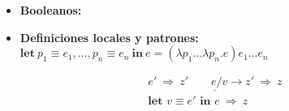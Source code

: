 \begin{itemize}
\begin{itemize}
\begin{multicols}{3}
              \[i'\neq 0\]
            \end{multicols}
          \end{itemize}
        \item \textbf{Booleanos:}
          \begin{itemize}
          \end{itemize}
        \item \textbf{Definiciones locales y patrones:} $\textbf{let}\ p_1 \equiv e_1, \ldots, p_n \equiv e_n\ \textbf{in}\ e = (\lambda p_1\ldots\lambda p_n.e) e_1 \ldots e_n$
          
          \[\begin{array}{c}
            \underline{e'\ \Rightarrow\  z' \qquad e/v \to z'\ \Rightarrow\ z} \\
            \textbf{let } v \equiv e' \textbf{ in } e \ \Rightarrow\ z
            \end{array}\]
      \end{itemize}
    
